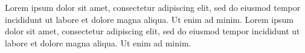 \begin{cvparagraph}

Lorem ipsum dolor sit amet, consectetur adipiscing elit, sed do eiusmod tempor incididunt ut labore et dolore magna aliqua. Ut enim ad minim. Lorem ipsum dolor sit amet, consectetur adipiscing elit, sed do eiusmod tempor incididunt ut labore et dolore magna aliqua. Ut enim ad minim.
\end{cvparagraph}
